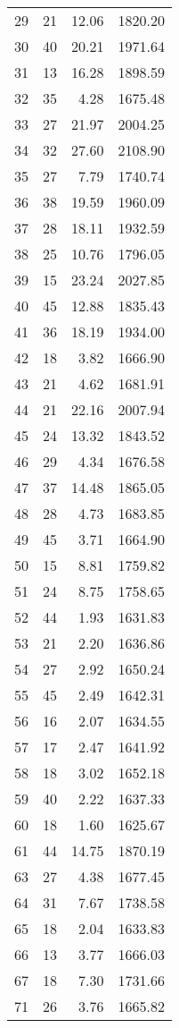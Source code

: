 \begin{appendix}
\begin{compacttable}
\begin{longtable}{@{}rrrr@{}}
29 & 21 & 12.06 & 1820.20 \\
30 & 40 & 20.21 & 1971.64 \\
31 & 13 & 16.28 & 1898.59 \\
32 & 35 & 4.28 & 1675.48 \\
33 & 27 & 21.97 & 2004.25 \\
34 & 32 & 27.60 & 2108.90 \\
35 & 27 & 7.79 & 1740.74 \\
36 & 38 & 19.59 & 1960.09 \\
37 & 28 & 18.11 & 1932.59 \\
38 & 25 & 10.76 & 1796.05 \\
39 & 15 & 23.24 & 2027.85 \\
40 & 45 & 12.88 & 1835.43 \\
41 & 36 & 18.19 & 1934.00 \\
42 & 18 & 3.82 & 1666.90 \\
43 & 21 & 4.62 & 1681.91 \\
44 & 21 & 22.16 & 2007.94 \\
45 & 24 & 13.32 & 1843.52 \\
46 & 29 & 4.34 & 1676.58 \\
47 & 37 & 14.48 & 1865.05 \\
48 & 28 & 4.73 & 1683.85 \\
49 & 45 & 3.71 & 1664.90 \\
50 & 15 & 8.81 & 1759.82 \\
51 & 24 & 8.75 & 1758.65 \\
52 & 44 & 1.93 & 1631.83 \\
53 & 21 & 2.20 & 1636.86 \\
54 & 27 & 2.92 & 1650.24 \\
55 & 45 & 2.49 & 1642.31 \\
56 & 16 & 2.07 & 1634.55 \\
57 & 17 & 2.47 & 1641.92 \\
58 & 18 & 3.02 & 1652.18 \\
59 & 40 & 2.22 & 1637.33 \\
60 & 18 & 1.60 & 1625.67 \\
61 & 44 & 14.75 & 1870.19 \\
63 & 27 & 4.38 & 1677.45 \\
64 & 31 & 7.67 & 1738.58 \\
65 & 18 & 2.04 & 1633.83 \\
66 & 13 & 3.77 & 1666.03 \\
67 & 18 & 7.30 & 1731.66 \\
71 & 26 & 3.76 & 1665.82 \\
\end{longtable}
\end{compacttable}


\end{appendix}
